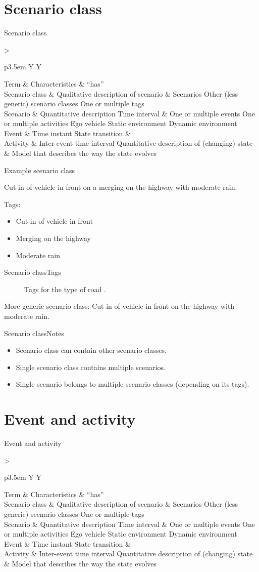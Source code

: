\documentclass[aspectratio=\AspectR,10pt,compress,t]{beamer} %
\newcommand{\otoprule}{\midrule[\heavyrulewidth]}				%
\newcommand{\ontologytable}[1]{%
	\begin{table}
		\begin{center}
			\footnotesize
			\begin{tabularx}{\linewidth}{>{\raggedright}p{3.5em} Y Y}
				\toprule
				Term & Characteristics & ``has'' \\ \otoprule
				\ifthenelse{\equal{#1}{2}}{\leavevmode\color{red}}{} Scenario class & \ifthenelse{\equal{#1}{2}}{\leavevmode\color{red}}{} Qualitative description of scenario & \ifthenelse{\equal{#1}{2}}{\leavevmode\color{red}}{} Scenarios \newline Other (less generic) scenario classes \newline One or multiple tags \\
				\ifthenelse{\equal{#1}{1}}{\leavevmode\color{red}}{} Scenario & \ifthenelse{\equal{#1}{1}}{\leavevmode\color{red}}{} Quantitative description \newline Time interval & \ifthenelse{\equal{#1}{1}}{\leavevmode\color{red}}{} One or multiple events \newline One or multiple activities \newline Ego vehicle \newline Static environment \newline Dynamic environment \\
				\ifthenelse{\equal{#1}{3}}{\leavevmode\color{red}}{} Event & \ifthenelse{\equal{#1}{3}}{\leavevmode\color{red}}{} Time instant \newline State transition & \\
				\ifthenelse{\equal{#1}{3}}{\leavevmode\color{red}}{} Activity & \ifthenelse{\equal{#1}{3}}{\leavevmode\color{red}}{} Inter-event time interval \newline Quantitative description of (changing) state & \ifthenelse{\equal{#1}{3}}{\leavevmode\color{red}}{} Model that describes the way the state evolves \\
				\bottomrule
			\end{tabularx}
		\end{center}
	\end{table}
}
\begin{document}
\section{Scenario class}
\begin{frame}{Scenario class}
	\ontologytable{2}
\end{frame}

\begin{frame}{Example scenario class}
	\begin{example}
		Cut-in of vehicle in front on a merging on the highway with moderate rain.
	\end{example}

	Tags:
	\begin{itemize}
		\item Cut-in of vehicle in front
		\item Merging on the highway
		\item Moderate rain
	\end{itemize}
\end{frame}

\begin{frame}{Scenario class}{Tags}
	\begin{figure}
		\begin{center}
			
			\caption{Tags for the type of road \cite{Bonnin2014}.}
		\end{center}
	\end{figure}

	More generic scenario class: Cut-in of vehicle in front on the highway with moderate rain.
\end{frame}

\begin{frame}{Scenario class}{Notes}
	\begin{itemize}
		\item Scenario class can contain other scenario classes.
		\item Single scenario class contains multiple scenarios.
		\item Single scenario belongs to multiple scenario classes (depending on its tags).
	\end{itemize}
\end{frame}

\section{Event and activity}
\begin{frame}{Event and activity}
	\ontologytable{3}
\end{frame}
\end{document}
